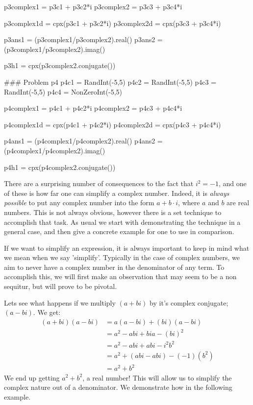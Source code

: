 \documentclass{ximera}
\begin{document}
\begin{sagesilent}
p3complex1 = p3c1 + p3c2*i
p3complex2 = p3c3 + p3c4*i

p3complex1d = cpx(p3c1 + p3c2*i)
p3complex2d = cpx(p3c3 + p3c4*i)

p3ans1 = (p3complex1/p3complex2).real()
p3ans2 = (p3complex1/p3complex2).imag()

p3h1 = cpx(p3complex2.conjugate())


### Problem p4
p4c1 = RandInt(-5,5)
p4c2 = RandInt(-5,5)
p4c3 = RandInt(-5,5)
p4c4 = NonZeroInt(-5,5)

p4complex1 = p4c1 + p4c2*i
p4complex2 = p4c3 + p4c4*i

p4complex1d = cpx(p4c1 + p4c2*i)
p4complex2d = cpx(p4c3 + p4c4*i)

p4ans1 = (p4complex1/p4complex2).real()
p4ans2 = (p4complex1/p4complex2).imag()

p4h1 = cpx(p4complex2.conjugate())




\end{sagesilent}

There are a surprising number of consequences to the fact that $i^2 = -1$, and one of these is how far one can simplify a complex number. Indeed, it is \textit{always possible} to put any complex number into the form $a + b\cdot i$, where $a$ and $b$ are real numbers. This is not always obvious, however there is a set technique to accomplish that task. As usual we start with demonstrating the technique in a general case, and then give a concrete example for one to use in comparison.

\begin{explanation}
    If we want to simplify an expression, it is always important to keep in mind what we mean when we say 'simplify'. Typically in the case of complex numbers, we aim to never have a complex number in the denominator of any term. To accomplish this, we will first make an observation that may seem to be a non sequitur, but will prove to be pivotal.
    
    Lets see what happens if we multiply $(a + bi)$ by it's complex conjugate; $(a - bi)$. We get:
    \begin{align*}
        (a+bi)(a-bi)    & = a(a-bi) + (bi)(a-bi)                 \\
                        & = a^2 - abi + bia - (bi)^2             \\
                        & = a^2 - abi + abi - i^2b^2             \\
                        & = a^2 + (abi - abi) - (-1)(b^2)        \\
                        & = a^2 + b^2
    \end{align*}
    We end up getting $a^2 + b^2$, a real number! This will allow us to simplify the complex nature out of a denominator. We demonstrate how in the following example.
        
\end{explanation}
\end{document}
